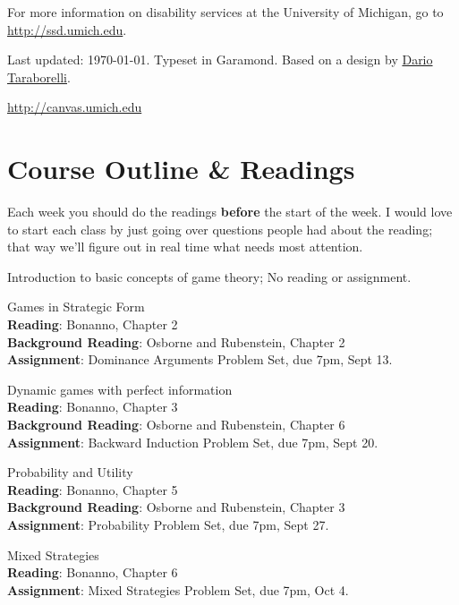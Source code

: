\documentclass[10pt]{article}
\newcommand{\years}[1]{\vspace{2pt}\marginnote{\scriptsize #1}}
\begin{document}
For more information on disability services at the University of Michigan, go to \url{http://ssd.umich.edu}. 

\vfill{}

\begin{center}
{\scriptsize  Last updated: \today. 
Typeset in Garamond. Based on a design by \href{http://nitens.org/taraborelli/cvtex}{Dario Taraborelli}.

\href{http://canvas.umich.edu}{http://canvas.umich.edu}}
\end{center}

\newpage
\section*{Course Outline \& Readings}

Each week you should do the readings \textbf{before} the start of the week. I would love to start each class by just going over questions people had about the reading; that way we'll figure out in real time what needs most attention.

\years{9/4} Introduction to basic concepts of game theory; No reading or assignment.

\years{9/9-11} Games in Strategic Form \\ 
\textbf{Reading}: Bonanno, Chapter 2 \\
\textbf{Background Reading}: Osborne and Rubenstein, Chapter 2\\
\textbf{Assignment}: Dominance Arguments Problem Set, due 7pm, Sept 13.

\years{9/16-18} Dynamic games with perfect information \\
\textbf{Reading}: Bonanno, Chapter 3\\
\textbf{Background Reading}:  Osborne and Rubenstein, Chapter 6 \\
\textbf{Assignment}: Backward Induction Problem Set, due 7pm, Sept 20.

\years{9/23-25} Probability and Utility \\
\textbf{Reading}: Bonanno, Chapter 5\\
\textbf{Background Reading}:  Osborne and Rubenstein, Chapter 3 \\
\textbf{Assignment}: Probability Problem Set, due 7pm, Sept 27.

\years{9/30-10/2} Mixed Strategies\\
\textbf{Reading}:  Bonanno, Chapter 6  \\
\textbf{Assignment}: Mixed Strategies Problem Set, due 7pm, Oct 4.
\end{document}
